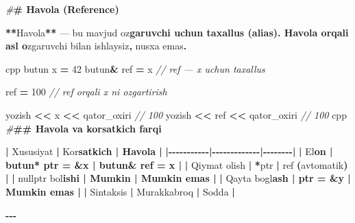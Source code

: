 \documentclass[a4paper,11pt,twoside,openright]{book}
\newenvironment{Shaded}{\begin{snugshade}}{\end{snugshade}}
\newcommand{\CharTok}[1]{\textcolor[rgb]{0.31,0.60,0.02}{#1}}
\newcommand{\CommentTok}[1]{\textcolor[rgb]{0.56,0.35,0.01}{\textit{#1}}}
\newcommand{\DecValTok}[1]{\textcolor[rgb]{0.00,0.00,0.81}{#1}}
\newcommand{\ErrorTok}[1]{\textcolor[rgb]{0.64,0.00,0.00}{\textbf{#1}}}
\newcommand{\NormalTok}[1]{#1}
\newcommand{\OperatorTok}[1]{\textcolor[rgb]{0.81,0.36,0.00}{\textbf{#1}}}
\newcommand{\PreprocessorTok}[1]{\textcolor[rgb]{0.56,0.35,0.01}{\textit{#1}}}
\begin{document}
\begin{Shaded}
\begin{Highlighting}[]
\PreprocessorTok{\#}\ErrorTok{\# Havola (Reference)}

\OperatorTok{**}\NormalTok{Havola}\OperatorTok{**}\NormalTok{ — bu mavjud o}\CharTok{\textquotesingle{}z}\ErrorTok{garuvchi uchun taxallus (alias). Havola orqali asl o}\CharTok{\textquotesingle{}}\NormalTok{zgaruvchi bilan ishlaysiz}\OperatorTok{,}\NormalTok{ nusxa emas}\OperatorTok{.}

\ErrorTok{\textasciigrave{}\textasciigrave{}\textasciigrave{}}\NormalTok{cpp}
\NormalTok{butun x }\OperatorTok{=} \DecValTok{42}
\NormalTok{butun}\OperatorTok{\&}\NormalTok{ ref }\OperatorTok{=}\NormalTok{ x       }\CommentTok{// ref — x uchun taxallus}

\NormalTok{ref }\OperatorTok{=} \DecValTok{100}            \CommentTok{// ref orqali x ni o\textquotesingle{}zgartirish}

\NormalTok{yozish }\OperatorTok{\textless{}\textless{}}\NormalTok{ x }\OperatorTok{\textless{}\textless{}}\NormalTok{ qator\_oxiri    }\CommentTok{// 100}
\NormalTok{yozish }\OperatorTok{\textless{}\textless{}}\NormalTok{ ref }\OperatorTok{\textless{}\textless{}}\NormalTok{ qator\_oxiri  }\CommentTok{// 100}
\ErrorTok{\textasciigrave{}\textasciigrave{}\textasciigrave{}}\NormalTok{cpp}
\PreprocessorTok{\#}\ErrorTok{\#\# Havola va ko\textquotesingle{}rsatkich farqi}

\OperatorTok{|}\NormalTok{ Xususiyat }\OperatorTok{|}\NormalTok{ Ko}\CharTok{\textquotesingle{}r}\ErrorTok{satkich | Havola |}
\OperatorTok{|{-}{-}{-}{-}{-}{-}{-}{-}{-}{-}{-}|{-}{-}{-}{-}{-}{-}{-}{-}{-}{-}{-}{-}{-}|{-}{-}{-}{-}{-}{-}{-}{-}|}
\OperatorTok{|}\NormalTok{ E}\CharTok{\textquotesingle{}l}\ErrorTok{on | \textasciigrave{}butun* ptr = \&x\textasciigrave{} | \textasciigrave{}butun\& ref = x\textasciigrave{} |}
\OperatorTok{|}\NormalTok{ Qiymat olish }\OperatorTok{|} \ErrorTok{\textasciigrave{}}\OperatorTok{*}\NormalTok{ptr}\ErrorTok{\textasciigrave{}} \OperatorTok{|} \ErrorTok{\textasciigrave{}}\NormalTok{ref}\ErrorTok{\textasciigrave{}} \OperatorTok{(}\NormalTok{avtomatik}\OperatorTok{)} \OperatorTok{|}
\OperatorTok{|} \ErrorTok{\textasciigrave{}}\NormalTok{nullptr}\ErrorTok{\textasciigrave{}}\NormalTok{ bo}\CharTok{\textquotesingle{}l}\ErrorTok{ishi | Mumkin | Mumkin emas |}
\OperatorTok{|}\NormalTok{ Qayta bog}\CharTok{\textquotesingle{}l}\ErrorTok{ash | \textasciigrave{}ptr = \&y\textasciigrave{} | Mumkin emas |}
\OperatorTok{|}\NormalTok{ Sintaksis }\OperatorTok{|}\NormalTok{ Murakkabroq }\OperatorTok{|}\NormalTok{ Sodda }\OperatorTok{|}

\OperatorTok{{-}{-}{-}}


\end{Highlighting}
\end{Shaded}
\end{document}
